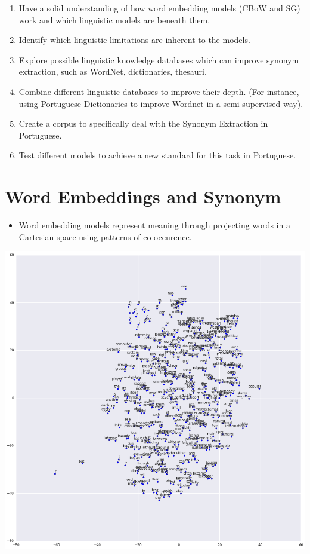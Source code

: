 \documentclass[a0,portrait]{a0poster}
\begin{document}
\begin{multicols}{2}
\begin{enumerate}
\item Have a solid understanding of how word embedding models (CBoW and SG) work and which linguistic models are beneath them.
\item Identify which linguistic limitations are inherent to the models.
\item Explore possible linguistic knowledge databases which can improve synonym extraction, such as WordNet, dictionaries, thesauri.
\item Combine different linguistic databases to improve their depth. (For instance, using Portuguese Dictionaries to improve Wordnet in a semi-supervised way).
\item Create a corpus to specifically deal with the Synonym Extraction in Portuguese.
\item Test different models to achieve a new standard for this task in Portuguese.

\end{enumerate}


\section*{Word Embeddings and Synonym}

\begin{itemize}
\item Word embedding models represent meaning through projecting words in a Cartesian space using patterns of co-occurence.\\
\end{itemize}
\begin{center}\vspace{1cm}
	\includegraphics[width=0.8\linewidth]{w2v.png}
\end{center}\vspace{1cm}


\end{multicols}
\end{document}
